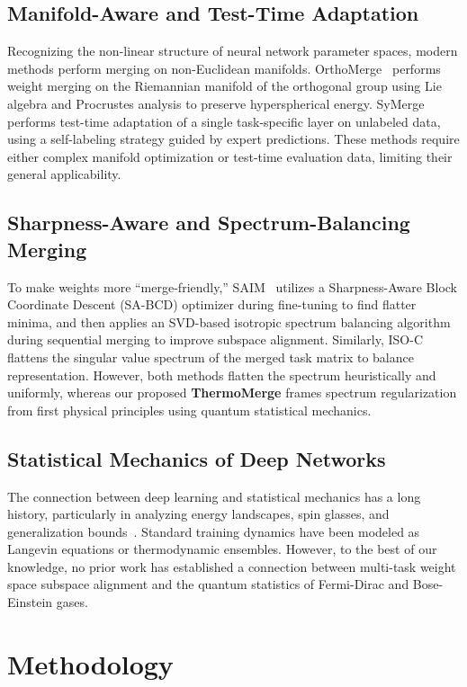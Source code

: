 \documentclass{article}
\theoremstyle{plain}
\theoremstyle{definition}
\theoremstyle{remark}
\begin{document}
\subsection{Manifold-Aware and Test-Time Adaptation}
Recognizing the non-linear structure of neural network parameter spaces, modern methods perform merging on non-Euclidean manifolds. OrthoMerge~\cite{yang26} performs weight merging on the Riemannian manifold of the orthogonal group using Lie algebra and Procrustes analysis to preserve hyperspherical energy. SyMerge~\cite{jung25} performs test-time adaptation of a single task-specific layer on unlabeled data, using a self-labeling strategy guided by expert predictions. These methods require either complex manifold optimization or test-time evaluation data, limiting their general applicability.

\subsection{Sharpness-Aware and Spectrum-Balancing Merging}
To make weights more ``merge-friendly,'' SAIM~\cite{saim26} utilizes a Sharpness-Aware Block Coordinate Descent (SA-BCD) optimizer during fine-tuning to find flatter minima, and then applies an SVD-based isotropic spectrum balancing algorithm during sequential merging to improve subspace alignment. Similarly, ISO-C~\cite{marczak25a} flattens the singular value spectrum of the merged task matrix to balance representation. However, both methods flatten the spectrum heuristically and uniformly, whereas our proposed \textbf{ThermoMerge} frames spectrum regularization from first physical principles using quantum statistical mechanics.

\subsection{Statistical Mechanics of Deep Networks}
The connection between deep learning and statistical mechanics has a long history, particularly in analyzing energy landscapes, spin glasses, and generalization bounds~\cite{choromanska15, baity18, martin19, martin21, bahri20}. Standard training dynamics have been modeled as Langevin equations or thermodynamic ensembles. However, to the best of our knowledge, no prior work has established a connection between multi-task weight space subspace alignment and the quantum statistics of Fermi-Dirac and Bose-Einstein gases.

\section{Methodology}
\label{sec:method}
\end{document}
